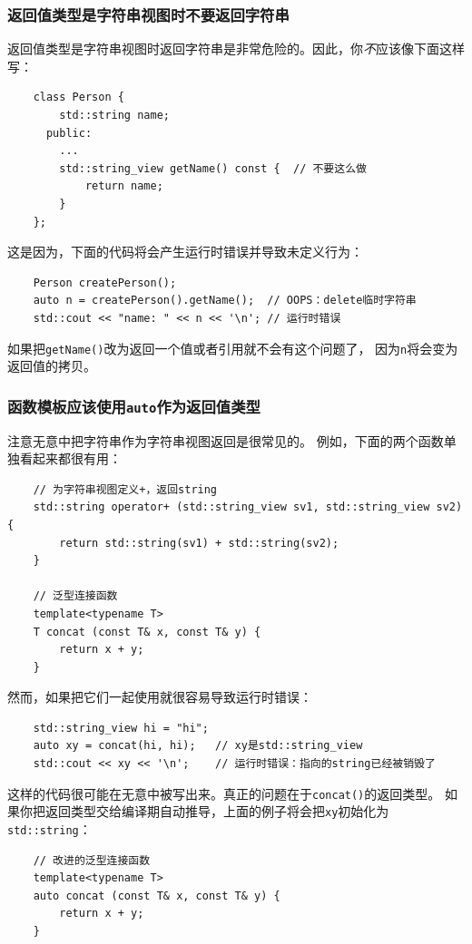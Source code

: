 \subsubsection{返回值类型是字符串视图时不要返回字符串}
返回值类型是字符串视图时返回字符串是非常危险的。因此，你\emph{不}应该像下面这样写：
\begin{lstlisting}
    class Person {
        std::string name;
      public:
        ...
        std::string_view getName() const {  // 不要这么做
            return name;
        }
    };
\end{lstlisting}
这是因为，下面的代码将会产生运行时错误并导致未定义行为：
\begin{lstlisting}
    Person createPerson();
    auto n = createPerson().getName();  // OOPS：delete临时字符串
    std::cout << "name: " << n << '\n'; // 运行时错误
\end{lstlisting}
如果把\texttt{getName()}改为返回一个值或者引用就不会有这个问题了，
因为\texttt{n}将会变为返回值的拷贝。

\subsubsection{函数模板应该使用\texttt{auto}作为返回值类型}
注意无意中把字符串作为字符串视图返回是很常见的。
例如，下面的两个函数单独看起来都很有用：
\begin{lstlisting}
    // 为字符串视图定义+，返回string
    std::string operator+ (std::string_view sv1, std::string_view sv2) {
        return std::string(sv1) + std::string(sv2);
    }

    // 泛型连接函数
    template<typename T>
    T concat (const T& x, const T& y) {
        return x + y;
    }
\end{lstlisting}
然而，如果把它们一起使用就很容易导致运行时错误：
\begin{lstlisting}
    std::string_view hi = "hi";
    auto xy = concat(hi, hi);   // xy是std::string_view
    std::cout << xy << '\n';    // 运行时错误：指向的string已经被销毁了
\end{lstlisting}
这样的代码很可能在无意中被写出来。真正的问题在于\texttt{concat()}的返回类型。
如果你把返回类型交给编译期自动推导，上面的例子将会把\texttt{xy}初始化为\texttt{std::string}：
\begin{lstlisting}
    // 改进的泛型连接函数
    template<typename T>
    auto concat (const T& x, const T& y) {
        return x + y;
    }
\end{lstlisting}

